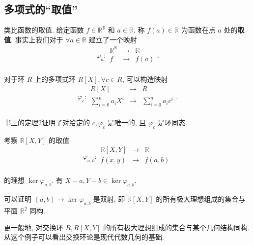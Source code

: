 \documentclass[color=black,device=normal,lang=cn,mode=geye]{elegantnote}
\begin{document}
\subsection{多项式的``取值''}
类比函数的取值. 给定函数 $f\in\mathbb{R}^\mathbb{R}$ 和 $a\in\mathbb{R}$, 称 $f(a)\in\mathbb{R}$ 为函数在点 $a$ 处的\textbf{取值}. 事实上我们对于 $\forall a\in\mathbb{R}$ 建立了一个映射
\[\varphi_a:\begin{array}{rcl}
    \mathbb{R}^\mathbb{R} & \to & \mathbb{R} \\
    f & \to & f(a) \\
\end{array}.\]

对于环 $R$ 上的多项式环 $R[X],\forall c\in R$, 可以构造映射
\[\varphi_c:\begin{array}{rcl}
    R[X] & \to & R \\
    \sum\limits_{i=0}^{n}a_iX^i & \to & \sum\limits_{i=0}^{n}a_ic^i \\
\end{array}.\]

书上的定理2证明了对给定的 $c,\varphi_c$ 是唯一的, 且 $\varphi_c$ 是环同态.
\begin{example}
    考察 $\mathbb{R}[X,Y]$ 的取值
    \[\varphi_{a,b}:\begin{array}{rcl}
        \mathbb{R}[X,Y] & \to & \mathbb{R} \\
        f(x,y) & \to & f(a,b) \\
    \end{array}\]

    的理想 $\ker\varphi_{a,b}$. 有 $X-a,Y-b\in\ker\varphi_{a,b}$.

    可以证明 $(a,b)\to\ker\varphi_{a,b}$ 是双射, 即 $\mathbb{R}[X,Y]$ 的所有极大理想组成的集合与平面 $\mathbb{R}^2$ 同构.

    更一般地, 对交换环 $R,R[X,Y]$ 的所有极大理想组成的集合与某个几何结构同构. 从这个例子可以看出交换环论是现代代数几何的基础.
\end{example}
\end{document}
